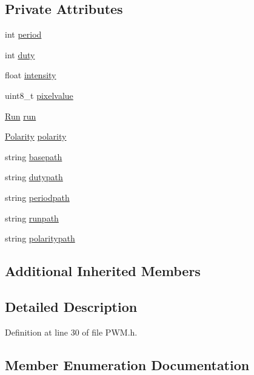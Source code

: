 \subsection*{Private Attributes}
\begin{DoxyCompactItemize}
\item 
int \hyperlink{class_hardware_1_1_p_w_m_a91323a511e37d396f46d08f4159ef761}{period}
\item 
int \hyperlink{class_hardware_1_1_p_w_m_a3309b2645c4c817384d91f33f0df5d64}{duty}
\item 
float \hyperlink{class_hardware_1_1_p_w_m_afcfc81ddeeb9c510ad4d00b215477d7a}{intensity}
\item 
uint8\+\_\+t \hyperlink{class_hardware_1_1_p_w_m_a27de0bd1068a57a970d21bbbe4fc0872}{pixelvalue}
\item 
\hyperlink{class_hardware_1_1_p_w_m_a6f1e614731154a3613c03a4238ddd107}{Run} \hyperlink{class_hardware_1_1_p_w_m_a04531646b41accced24d46046c4bc7de}{run}
\item 
\hyperlink{class_hardware_1_1_p_w_m_a728111433109229b4da1efc953a107c1}{Polarity} \hyperlink{class_hardware_1_1_p_w_m_ad346586d086f8462c3de6a4c19edb1d3}{polarity}
\item 
string \hyperlink{class_hardware_1_1_p_w_m_a344f82a0812dceb40aa48d4789d09c68}{basepath}
\item 
string \hyperlink{class_hardware_1_1_p_w_m_a53311e9df6960751465d5f0b81192226}{dutypath}
\item 
string \hyperlink{class_hardware_1_1_p_w_m_a27e17a6c2e9720c571d5939f1a9ffb12}{periodpath}
\item 
string \hyperlink{class_hardware_1_1_p_w_m_ac1eb93467481ee2bd3565f1be47b8a01}{runpath}
\item 
string \hyperlink{class_hardware_1_1_p_w_m_ace89c96484ffa9d6c9f3a8067848bf51}{polaritypath}
\end{DoxyCompactItemize}
\subsection*{Additional Inherited Members}


\subsection{Detailed Description}


Definition at line 30 of file P\+W\+M.\+h.



\subsection{Member Enumeration Documentation}
\hypertarget{class_hardware_1_1_p_w_m_a7cc6acf1c28f0eaef16246635dc0353a}{}
